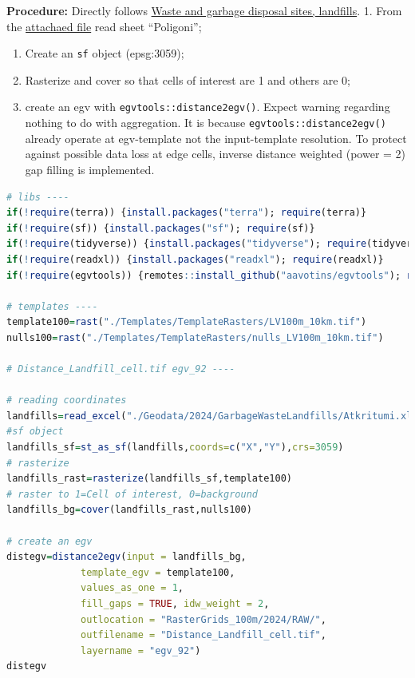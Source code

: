 \documentclass[
]{book}
\newcommand{\passthrough}[1]{#1}
\begin{document}
\textbf{Procedure:} Directly follows \hyperref[Ch04.14]{Waste and garbage disposal sites, landfills}.
1. From the \href{https://github.com/aavotins/HiQBioDiv_EGVs/blob/main/Data/Geodata/2024/GarbageWasteLandfills/Atkritumi.xlsx}{attachaed file} read sheet ``Poligoni'';

\begin{enumerate}
\def\labelenumi{\arabic{enumi}.}
\setcounter{enumi}{1}
\item
  Create an \passthrough{\lstinline!sf!} object (epsg:3059);
\item
  Rasterize and cover so that cells of interest are 1 and others are 0;
\item
  create an egv with \passthrough{\lstinline!egvtools::distance2egv()!}. Expect warning regarding nothing
  to do with aggregation. It is because \passthrough{\lstinline!egvtools::distance2egv()!} already operate at
  egv-template not the input-template resolution. To protect against possible data loss at edge cells,
  inverse distance weighted (power = 2) gap filling is implemented.
\end{enumerate}

\begin{lstlisting}[language=R]
# libs ----
if(!require(terra)) {install.packages("terra"); require(terra)}
if(!require(sf)) {install.packages("sf"); require(sf)}
if(!require(tidyverse)) {install.packages("tidyverse"); require(tidyverse)}
if(!require(readxl)) {install.packages("readxl"); require(readxl)}
if(!require(egvtools)) {remotes::install_github("aavotins/egvtools"); require(egvtools)}

# templates ----
template100=rast("./Templates/TemplateRasters/LV100m_10km.tif")
nulls100=rast("./Templates/TemplateRasters/nulls_LV100m_10km.tif")

# Distance_Landfill_cell.tif egv_92 ----

# reading coordinates
landfills=read_excel("./Geodata/2024/GarbageWasteLandfills/Atkritumi.xlsx",sheet="Poligoni")
#sf object
landfills_sf=st_as_sf(landfills,coords=c("X","Y"),crs=3059)
# rasterize
landfills_rast=rasterize(landfills_sf,template100)
# raster to 1=Cell of interest, 0=background
landfills_bg=cover(landfills_rast,nulls100)

# create an egv
distegv=distance2egv(input = landfills_bg,
             template_egv = template100,
             values_as_one = 1,
             fill_gaps = TRUE, idw_weight = 2,
             outlocation = "RasterGrids_100m/2024/RAW/",
             outfilename = "Distance_Landfill_cell.tif",
             layername = "egv_92")
distegv
\end{lstlisting}
\end{document}
